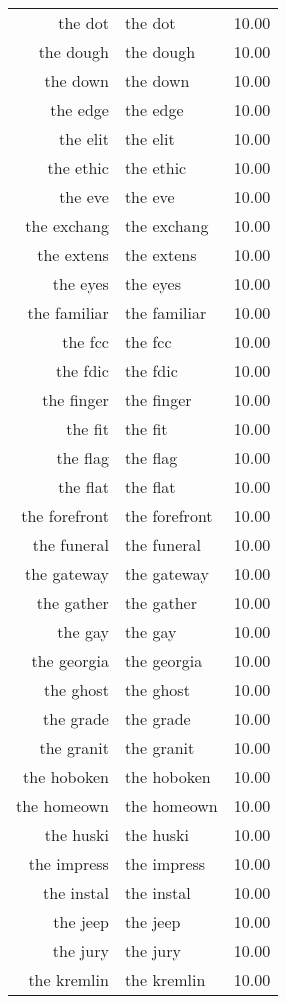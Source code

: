 \begin{table}[ht]
\begin{tabular}{rlr}
  the dot & the dot & 10.00 \\ 
  the dough & the dough & 10.00 \\ 
  the down & the down & 10.00 \\ 
  the edge & the edge & 10.00 \\ 
  the elit & the elit & 10.00 \\ 
  the ethic & the ethic & 10.00 \\ 
  the eve & the eve & 10.00 \\ 
  the exchang & the exchang & 10.00 \\ 
  the extens & the extens & 10.00 \\ 
  the eyes & the eyes & 10.00 \\ 
  the familiar & the familiar & 10.00 \\ 
  the fcc & the fcc & 10.00 \\ 
  the fdic & the fdic & 10.00 \\ 
  the finger & the finger & 10.00 \\ 
  the fit & the fit & 10.00 \\ 
  the flag & the flag & 10.00 \\ 
  the flat & the flat & 10.00 \\ 
  the forefront & the forefront & 10.00 \\ 
  the funeral & the funeral & 10.00 \\ 
  the gateway & the gateway & 10.00 \\ 
  the gather & the gather & 10.00 \\ 
  the gay & the gay & 10.00 \\ 
  the georgia & the georgia & 10.00 \\ 
  the ghost & the ghost & 10.00 \\ 
  the grade & the grade & 10.00 \\ 
  the granit & the granit & 10.00 \\ 
  the hoboken & the hoboken & 10.00 \\ 
  the homeown & the homeown & 10.00 \\ 
  the huski & the huski & 10.00 \\ 
  the impress & the impress & 10.00 \\ 
  the instal & the instal & 10.00 \\ 
  the jeep & the jeep & 10.00 \\ 
  the jury & the jury & 10.00 \\ 
  the kremlin & the kremlin & 10.00 \\ 

\end{tabular}
\end{table}
